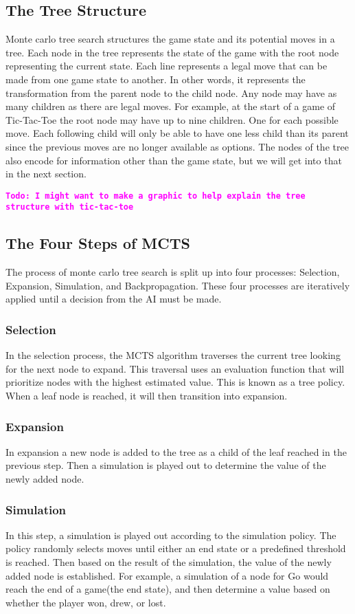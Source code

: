 \documentclass{sig-alternate}
\newcommand{\comment}[1]{{\bf \tt  {#1}}}
\newcommand{\todo}[1]{\textcolor{magenta}{\comment{Todo: {#1}}}}
\begin{document}
\subsection{The Tree Structure}
Monte carlo tree search structures the game state and its potential moves in a tree. Each node in the tree represents the state of the game with the root node representing the current state. Each line represents a legal move that can be made from one game state to another. In other words, it represents the transformation from the parent node to the child node. Any node may have as many children as there are legal moves. For example, at the start of a game of Tic-Tac-Toe the root node may have up to nine children. One for each possible move. Each following child will only be able to have one less child than its parent since the previous moves are no longer available as options. The nodes of the tree also encode for information other than the game state, but we will get into that in the next section.

\todo{I might want to make a graphic to help explain the tree structure with tic-tac-toe}

\subsection{The Four Steps of MCTS}
The process of monte carlo tree search is split up into four processes: Selection, Expansion, Simulation, and Backpropagation. These four processes are iteratively applied until a decision from the AI must be made.

\subsubsection{Selection}
In the selection process, the MCTS algorithm traverses the current tree looking for the next node to expand. This traversal uses an evaluation function that will prioritize nodes with the highest estimated value. This is known as a tree policy. When a leaf node is reached, it will then transition into expansion.

\subsubsection{Expansion}
In expansion a new node is added to the tree as a child of the leaf reached in the previous step. Then a simulation is played out to determine the value of the newly added node.

\subsubsection{Simulation}
In this step, a simulation is played out according to the simulation policy. The policy randomly selects moves until either an end state or a predefined threshold is reached. Then based on the result of the simulation, the value of the newly added node is established. For example, a simulation of a node for Go would reach the end of a game(the end state), and then determine a value based on whether the player won, drew, or lost.
\end{document}
